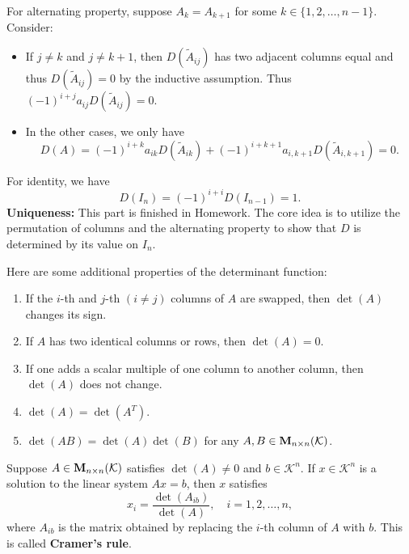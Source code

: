 \begin{proofenv}
        For alternating property, suppose $A_k = A_{k+1}$ for some $k\in \{1,2,\ldots,n-1\}$. Consider:
        \begin{itemize}
            \item If $j\neq k$ and $j\neq k+1$, then $D(\tilde{A}_{ij})$ has two adjacent columns equal and thus $D(\tilde{A}_{ij})=0$ by the inductive assumption. Thus $(-1)^{i+j} a_{ij} D(\tilde{A}_{ij}) = 0$.
            \item In the other cases, we only have
            \[
            D(A) = (-1)^{i+k} a_{ik} D(\tilde{A}_{ik}) + (-1)^{i+k+1} a_{i,k+1} D(\tilde{A}_{i,k+1}) = 0.
            \]
        \end{itemize}

        For identity, we have
        \[
        D(I_n) = (-1)^{i+i} D(I_{n-1}) = 1.
        \]
        \textbf{Uniqueness:} This part is finished in Homework. The core idea is to utilize the permutation of columns and the alternating property to show that $D$ is determined by its value on $I_n$.
    \end{proofenv}
    \begin{theoremenv}
        Here are some additional properties of the determinant function:
        \begin{enumerate}
            \item If the $i$-th and $j$-th $(i\neq j)$ columns of $A$ are swapped, then $\det(A)$ changes its sign.
            \item If $A$ has two identical columns or rows, then $\det(A) = 0$.
            \item If one adds a scalar multiple of one column to another column, then $\det(A)$ does not change.
            \item $\det(A) = \det(A^T)$.
            \item $\det(AB) = \det(A)\det(B)$ for any $A,B \in \mathbf{M}_{n \times n}(\mathcal{K})$.
        \end{enumerate}
    \end{theoremenv}
    \begin{theoremenv}
        Suppose $A\in\mathbf{M}_{n \times n}(\mathcal{K})$ satisfies $\det(A) \neq 0$ and $b\in \mathcal{K}^n$. If $x\in \mathcal{K}^n$ is a solution to the linear system $Ax=b$, then $x$ satisfies
        \[
        x_i = \frac{\det(A_{ib})}{\det(A)}, \quad i=1,2,\ldots,n,
        \]
        where $A_{ib}$ is the matrix obtained by replacing the $i$-th column of $A$ with $b$. This is called \textbf{Cramer's rule}.
    \end{theoremenv}

